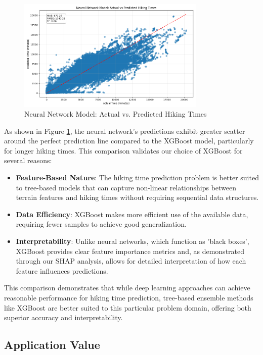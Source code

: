 \documentclass[12pt]{article}
\begin{document}
\begin{figure}[H]
\centering
\includegraphics[width=0.8\textwidth]{nn_results/predictions.png}
\caption{Neural Network Model: Actual vs. Predicted Hiking Times}
\label{fig:nn_predictions}
\end{figure}

As shown in Figure \ref{fig:nn_predictions}, the neural network's predictions exhibit greater scatter around the perfect prediction line compared to the XGBoost model, particularly for longer hiking times. This comparison validates our choice of XGBoost for several reasons:

\begin{itemize}
  \item \textbf{Feature-Based Nature}: The hiking time prediction problem is better suited to tree-based models that can capture non-linear relationships between terrain features and hiking times without requiring sequential data structures.
  \item \textbf{Data Efficiency}: XGBoost makes more efficient use of the available data, requiring fewer samples to achieve good generalization.
  \item \textbf{Interpretability}: Unlike neural networks, which function as 'black boxes', XGBoost provides clear feature importance metrics and, as demonstrated through our SHAP analysis, allows for detailed interpretation of how each feature influences predictions.
\end{itemize}

This comparison demonstrates that while deep learning approaches can achieve reasonable performance for hiking time prediction, tree-based ensemble methods like XGBoost are better suited to this particular problem domain, offering both superior accuracy and interpretability.

\subsection{Application Value}
\end{document}
